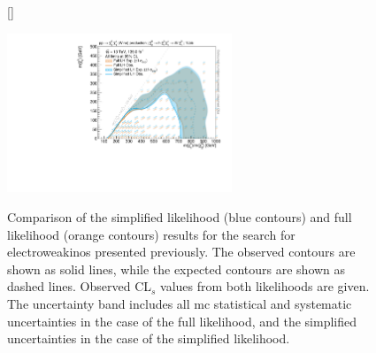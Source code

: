 \begin{figure}[hb]
[\FBwidth]
{\caption{Comparison of the simplified likelihood (blue contours) and full likelihood (orange contours) results for the search for electroweakinos presented previously. The observed contours are shown as solid lines, while the expected contours are shown as dashed lines. Observed CL$_s$ values from both likelihoods are given. The uncertainty band includes all \gls{mc} statistical and systematic uncertainties in the case of the full likelihood, and the simplified uncertainties in the case of the simplified likelihood.}\label{fig:app_results_simplify_1Lbb}}
{\includegraphics[width=0.60\textwidth]{exclusion_1Lbb_CLs_noLabel}}
\end{figure}



